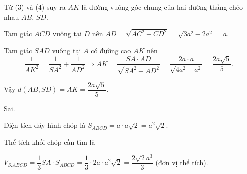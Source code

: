 \begin{ex}
{\begin{itemchoice}
			Từ (3) và (4) suy ra $AK$ là đường vuông góc chung của hai đường thẳng chéo nhau $AB$, $SD$.
			
			Tam giác $ACD$ vuông tại $D$ nên $AD=\sqrt{AC^2-CD^2}=\sqrt{3a^2-2a^2}=a$.
			
			Tam giác $SAD$ vuông tại $A$ có đường cao $AK$ nên
			\[\dfrac{1}{AK^2}=\dfrac{1}{SA^2}+\dfrac{1}{AD^2} \Rightarrow AK=\dfrac{SA\cdot AD}{\sqrt{SA^2+AD^2}}=\dfrac{2a\cdot a}{\sqrt{4a^2+a^2}}=\dfrac{2a\sqrt{5}}{5}.\;\]
			
			Vậy $d(AB,SD)=AK=\dfrac{2a\sqrt{5}}{5}$.
			
			\itemch Sai.
			
			Diện tích đáy hình chóp là $S_{ABCD}=a\cdot a\sqrt{2}=a^2\sqrt{2}$.
			
			Thể tích khối chóp cần tìm là
			
			$V_{S.ABCD}=\dfrac{1}{3} SA\cdot S_{ABCD}=\dfrac{1}{3} \cdot 2a\cdot a^2\sqrt{2}=\dfrac{2\sqrt{2} a^3}{3} $ (đơn vị thể tích).
		\end{itemchoice}
	}
\end{ex}



